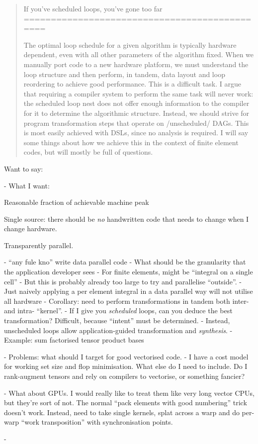 \documentclass[presentation]{beamer}
\begin{document}
\begin{abstract}
  If you've scheduled loops, you've gone too far
  ==============================================

  The optimal loop schedule for a given algorithm is typically
  hardware dependent, even with all other parameters of the algorithm
  fixed.  When we manually port code to a new hardware platform, we
  must understand the loop structure and then perform, in tandem, data
  layout and loop reordering to achieve good performance.  This is a
  difficult task.  I argue that requiring a compiler system to perform
  the same task will never work: the scheduled loop nest does not
  offer enough information to the compiler for it to determine the
  algorithmic structure.  Instead, we should strive for program
  transformation steps that operate on /unscheduled/ DAGs.  This is
  most easily achieved with DSLs, since no analysis is required.  I
  will say some things about how we achieve this in the context of
  finite element codes, but will mostly be full of questions.
  
\end{abstract}

Want to say:

- What I want:

Reasonable fraction of achievable machine peak

Single source: there should be \emph{no} handwritten code that needs
to change when I change hardware.

Transparently parallel.

- ``any fule kno'' write data parallel code
- What should be the granularity that the application developer sees
- For finite elements, might be ``integral on a single cell''
- But this is probably already too large to try and parallelise
``outside''.
- Just naively applying a per element integral in a data parallel way
will not utilise all hardware
- Corollary: need to perform transformations in tandem both inter- and
intra- ``kernel''.
- If I give you \emph{scheduled} loops, can you deduce the best
transformation?  Difficult, because ``intent'' must be determined.
- Instead, unscheduled loops allow application-guided transformation
and \emph{synthesis}.
- Example: sum factorised tensor product bases

- Problems: what should I target for good vectorised code.
- I have a cost model for working set size and flop minimisation.
What else do I need to include.  Do I rank-augment tensors and rely on
compilers to vectorise, or something fancier?

- What about GPUs.  I would really like to treat them like very long
vector CPUs, but they're sort of not.  The normal ``pack elements with
good numbering'' trick doesn't work.  Instead, need to take single
kernels, splat across a warp and do per-warp ``work transposition''
with synchronisation points.

- 
\end{document}

